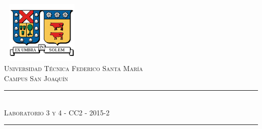\documentclass[letterpaper]{article}
\newcommand{\5}
{
\\[.5cm]
}
\begin{document}
\begin{titlepage}


\begin{center}

\includegraphics[width=4cm,height=3cm]{logo-usm}
\\[1.0cm]


\textsc{\Large Universidad Técnica Federico Santa María \\[0.5cm] Campus San Joaquín}
\\[1.0cm]


\noindent\rule{16cm}{0.4pt}
\\[0.5cm]
    {\textsc{\Large Laboratorio 3 y 4 - CC2 - 2015-2}}
\\[0.5cm]
\noindent\rule{16cm}{0.4pt}
\\[0.5cm]


\begin{minipage}{1.0\textwidth}


\end{minipage}

\end{center}
\end{titlepage}

\newpage
\end{document}
